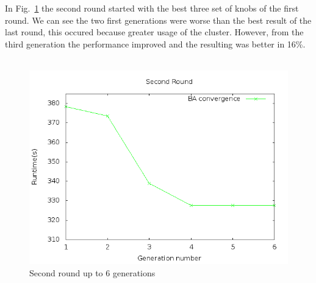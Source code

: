 In Fig.~\ref{fig:6gen} the second round started with the best three set of knobs
of the first round. We can see the two first generations were worse than the best
result of the last round, this occured because greater usage of the cluster. However,
from the third generation the performance improved and the resulting was better
in 16\%.
\\
\\
\begin{figure}[htbp]
\begin{center}
	\includegraphics[scale=0.6]{graphics/img/6gen.png}
\caption{Second round up to 6 generations} \label{fig:6gen}
\end{center}
\end{figure}
\\
\\
\\
\\
\\
\\
\\
\\
\\
\\
\\
\\
\\
\\
\\
\\
\\

